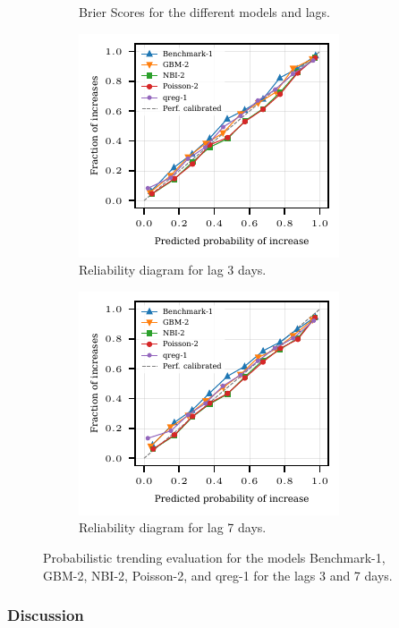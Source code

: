\begin{figure}
    \begin{subfigure}{0.32\textwidth}
    \tiny
    
    \caption{Brier Scores for the different models and lags.}\label{fig:app-eda-prob-brier}
    \end{subfigure}\hspace{0.01\textwidth}%
    \begin{subfigure}[t]{0.32\textwidth}
    \includegraphics{plots/ed_arrival/60_reliability_diagram_lag_3}
    \caption{Reliability diagram for lag 3 days.}\label{fig:app-eda-prob-rel-3}
    \end{subfigure}\hspace{0.01\textwidth}%
    \begin{subfigure}[t]{0.32\textwidth}
    \includegraphics{plots/ed_arrival/60_reliability_diagram_lag_7}
    \caption{Reliability diagram for lag 7 days.}\label{fig:app-eda-prob-rel-7}
    \end{subfigure}
    \caption{Probabilistic trending evaluation for the models Benchmark-1, GBM-2, NBI-2, Poisson-2, and qreg-1 for the lags 3 and 7 days.}
    \label{fig:app-eda-prob}
\end{figure}

\subsubsection*{Discussion}

